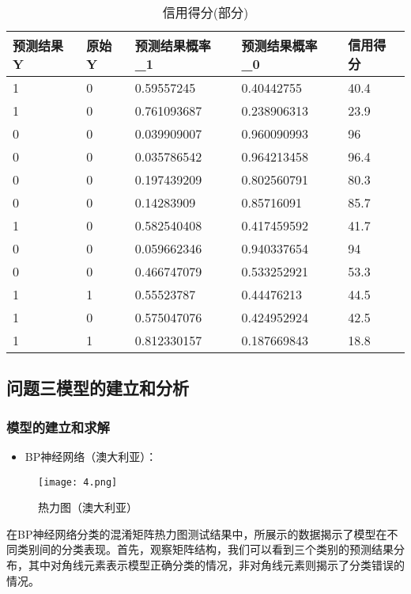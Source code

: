 \documentclass[12pt,a4paper]{nmmcm}
\begin{document}
\begin{table}[]
    \centering
\begin{tabular}{lllll}
\hline
预测结果Y & 原始Y& 预测结果概率\_1 & 预测结果概率\_0 & 信用得分     \\
\hline
1     & 0                           & 0.59557245  & 0.40442755  & 40.4 \\
1     & 0                           & 0.761093687 & 0.238906313 & 23.9 \\
0     & 0                           & 0.039909007 & 0.960090993 & 96   \\
0     & 0                           & 0.035786542 & 0.964213458 & 96.4 \\
0     & 0                           & 0.197439209 & 0.802560791 & 80.3 \\
0     & 0                           & 0.14283909  & 0.85716091  & 85.7 \\
1     & 0                           & 0.582540408 & 0.417459592 & 41.7 \\
0     & 0                           & 0.059662346 & 0.940337654 & 94   \\
0     & 0                           & 0.466747079 & 0.533252921 & 53.3 \\
1     & 1                           & 0.55523787  & 0.44476213  & 44.5 \\
1     & 0                           & 0.575047076 & 0.424952924 & 42.5 \\
1     & 1                           & 0.812330157 & 0.187669843 & 18.8\\ \hline
\end{tabular}
 \caption{信用得分(部分)}
    \label{tab:my_label}
\end{table}


\subsection{问题三模型的建立和分析}
\subsubsection{模型的建立和求解}
\begin{itemize}
   \item
   BP神经网络（澳大利亚）：
   \end{itemize}
\begin{figure}
    \centering
    \texttt{[image: 4.png]}
    \caption{热力图（澳大利亚）}
    \label{fig:enter-label}
\end{figure}
在BP神经网络分类的混淆矩阵热力图测试结果中，所展示的数据揭示了模型在不同类别间的分类表现。首先，观察矩阵结构，我们可以看到三个类别的预测结果分布，其中对角线元素表示模型正确分类的情况，非对角线元素则揭示了分类错误的情况。
\end{document}
